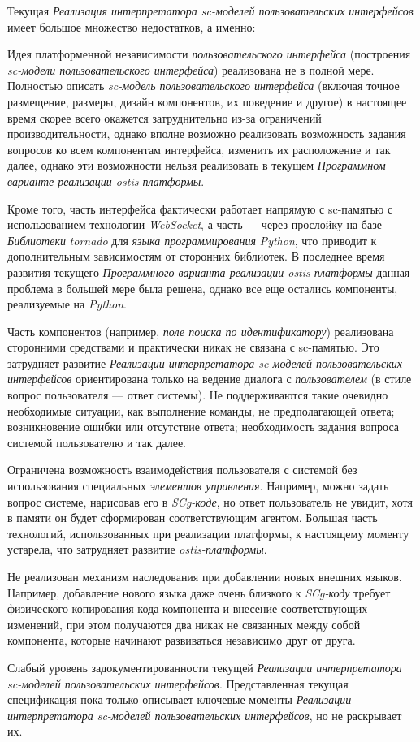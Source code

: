Текущая \textit{Реализация интерпретатора sc-моделей пользовательских интерфейсов} имеет большое множество недостатков, а именно:
\begin{textitemize}
	\item Идея платформенной независимости \textit{пользовательского интерфейса} (построения \textit{sc-модели пользовательского интерфейса}) реализована не в полной мере. Полностью описать \textit{sc-модель пользовательского интерфейса} (включая точное размещение, размеры, дизайн компонентов, их поведение и другое) в настоящее время скорее всего окажется затруднительно из-за ограничений производительности, однако вполне возможно реализовать возможность задания вопросов ко всем компонентам интерфейса, изменить их расположение и так далее, однако эти возможности нельзя реализовать в текущем \textit{Программном варианте реализации ostis-платформы}.
	\item Кроме того, часть интерфейса фактически работает напрямую с sc-памятью с использованием технологии \textit{WebSocket}, а часть --- через прослойку на базе \textit{Библиотеки} \textit{tornado} для \textit{языка программирования} \textit{Python}, что приводит к дополнительным зависимостям от сторонних библиотек. В последнее время развития текущего \textit{Программного варианта реализации ostis-платформы} данная проблема в большей мере была решена, однако все еще остались компоненты, реализуемые на \textit{Python}.
	\item Часть компонентов (например, \textit{поле поиска по идентификатору}) реализована сторонними средствами и практически никак не связана с sc-памятью. Это затрудняет развитие \textit{Реализации интерпретатора sc-моделей пользовательских интерфейсов} ориентирована только на ведение диалога с \textit{пользователем} (в стиле вопрос пользователя --- ответ системы). Не поддерживаются такие очевидно необходимые ситуации, как выполнение команды, не предполагающей ответа; возникновение ошибки или отсутствие ответа; необходимость задания вопроса системой пользователю и так далее.
	\item Ограничена возможность взаимодействия пользователя с системой без использования специальных \textit{элементов управления}. Например, можно задать вопрос системе, нарисовав его в \textit{SCg-коде}, но ответ пользователь не увидит, хотя в памяти он будет сформирован соответствующим агентом. Большая часть технологий, использованных при реализации платформы, к настоящему моменту устарела, что затрудняет развитие \textit{ostis-платформы}.
	\item Не реализован механизм наследования при добавлении новых внешних языков. Например, добавление нового языка даже очень близкого к \textit{SCg-коду} требует физического копирования кода компонента и внесение соответствующих изменений, при этом получаются два никак не связанных между собой компонента, которые начинают развиваться независимо друг от друга.
	\item Слабый уровень задокументированности текущей \textit{Реализации интерпретатора sc-моделей пользовательских интерфейсов}. Представленная текущая спецификация пока только описывает ключевые моменты \textit{Реализации интерпретатора sc-моделей пользовательских интерфейсов}, но не раскрывает их.
\end{textitemize}

